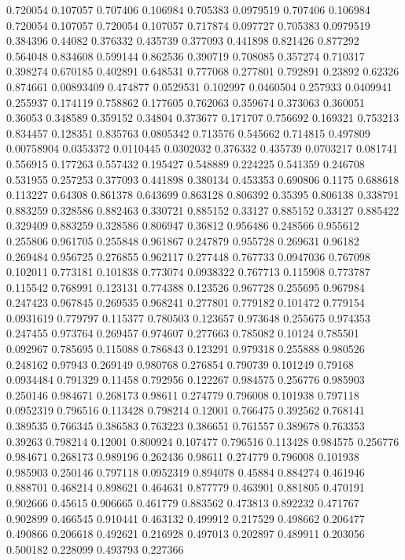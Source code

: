 0.720054 0.107057
0.707406 0.106984
0.705383 0.0979519
0.707406 0.106984
0.720054 0.107057
0.720054 0.107057
0.717874 0.097727
0.705383 0.0979519
0.384396 0.44082
0.376332 0.435739
0.377093 0.441898
0.821426 0.877292
0.564048 0.834608
0.599144 0.862536
0.390719 0.708085
0.357274 0.710317
0.398274 0.670185
0.402891 0.648531
0.777068 0.277801
0.792891 0.23892
0.62326 0.874661
0.00893409 0.474877
0.0529531 0.102997
0.0460504 0.257933
0.0409941 0.255937
0.174119 0.758862
0.177605 0.762063
0.359674 0.373063
0.360051 0.36053
0.348589 0.359152
0.34804 0.373677
0.171707 0.756692
0.169321 0.753213
0.834457 0.128351
0.835763 0.0805342
0.713576 0.545662
0.714815 0.497809
0.00758904 0.0353372
0.0110445 0.0302032
0.376332 0.435739
0.0703217 0.081741
0.556915 0.177263
0.557432 0.195427
0.548889 0.224225
0.541359 0.246708
0.531955 0.257253
0.377093 0.441898
0.380134 0.453353
0.690806 0.1175
0.688618 0.113227
0.64308 0.861378
0.643699 0.863128
0.806392 0.35395
0.806138 0.338791
0.883259 0.328586
0.882463 0.330721
0.885152 0.33127
0.885152 0.33127
0.885422 0.329409
0.883259 0.328586
0.806947 0.36812
0.956486 0.248566
0.955612 0.255806
0.961705 0.255848
0.961867 0.247879
0.955728 0.269631
0.96182 0.269484
0.956725 0.276855
0.962117 0.277448
0.767733 0.0947036
0.767098 0.102011
0.773181 0.101838
0.773074 0.0938322
0.767713 0.115908
0.773787 0.115542
0.768991 0.123131
0.774388 0.123526
0.967728 0.255695
0.967984 0.247423
0.967845 0.269535
0.968241 0.277801
0.779182 0.101472
0.779154 0.0931619
0.779797 0.115377
0.780503 0.123657
0.973648 0.255675
0.974353 0.247455
0.973764 0.269457
0.974607 0.277663
0.785082 0.10124
0.785501 0.092967
0.785695 0.115088
0.786843 0.123291
0.979318 0.255888
0.980526 0.248162
0.97943 0.269149
0.980768 0.276854
0.790739 0.101249
0.79168 0.0934484
0.791329 0.11458
0.792956 0.122267
0.984575 0.256776
0.985903 0.250146
0.984671 0.268173
0.98611 0.274779
0.796008 0.101938
0.797118 0.0952319
0.796516 0.113428
0.798214 0.12001
0.766475 0.392562
0.768141 0.389535
0.766345 0.386583
0.763223 0.386651
0.761557 0.389678
0.763353 0.39263
0.798214 0.12001
0.800924 0.107477
0.796516 0.113428
0.984575 0.256776
0.984671 0.268173
0.989196 0.262436
0.98611 0.274779
0.796008 0.101938
0.985903 0.250146
0.797118 0.0952319
0.894078 0.45884
0.884274 0.461946
0.888701 0.468214
0.898621 0.464631
0.877779 0.463901
0.881805 0.470191
0.902666 0.45615
0.906665 0.461779
0.883562 0.473813
0.892232 0.471767
0.902899 0.466545
0.910441 0.463132
0.499912 0.217529
0.498662 0.206477
0.490866 0.206618
0.492621 0.216928
0.497013 0.202897
0.489911 0.203056
0.500182 0.228099
0.493793 0.227366
